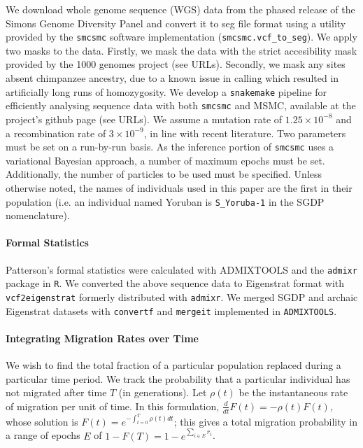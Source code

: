 \documentclass{article}
\begin{document}
We download whole genome sequence (WGS) data from the phased release of the Simons Genome Diversity Panel and convert it to seg file format using a utility provided by the {\tt smcsmc} software implementation ({\tt smcsmc.vcf\_to\_seg}). We apply two masks to the data. Firstly, we mask the data with the strict accesibility mask provided by the 1000 genomes project (see URLs). Secondly, we mask any sites absent chimpanzee ancestry, due to a known issue in calling which resulted in artificially long runs of homozygosity. We develop a {\tt snakemake} pipeline for efficiently analysing sequence data with both {\tt smcsmc} and MSMC, available at the project's github page (see URLs). We assume a mutation rate of $1.25\times10^{-8}$ and a recombination rate of $3\times10^{-9}$, in line with recent literature. Two parameters must be set on a run-by-run basis. As the inference portion of {\tt smcsmc} uses a variational Bayesian approach, a number of maximum epochs must be set. Additionally, the number of particles to be used must be specified. Unless otherwise noted, the names of individuals used in this paper are the first in their population (i.e. an individual named Yoruban is {\tt S\_Yoruba-1} in the SGDP nomenclature). 


\paragraph{Formal Statistics} Patterson's formal statistics were calculated with ADMIXTOOLS \cite{Patterson2012} and the {\tt admixr} package \cite{Petr2019} in {\tt R}. We converted the above sequence data to Eigenstrat format with {\tt vcf2eigenstrat} %
formerly distributed with {\tt admixr}. We merged SGDP and archaic Eigenstrat datasets with {\tt convertf} and {\tt mergeit} implemented in {\tt ADMIXTOOLS}. 


\paragraph{Integrating Migration Rates over Time}
We wish to find the total fraction of a particular population replaced during a particular time period. We track the probability that a particular individual has not migrated after time $T$ (in generations). Let $\rho(t)$ be the instantaneous rate of migration per unit of time. In this formulation, $\frac{d}{dt} F(t) = - \rho(t) F(t)$, whose solution is $F(t) = e^{- \int_{t=0}^T \rho(t) dt}$; this gives a total migration probability in a range of epochs $E$ of  $1-F(T) = 1 - e^{\sum_{i \in E} r_i}$. 
\end{document}
